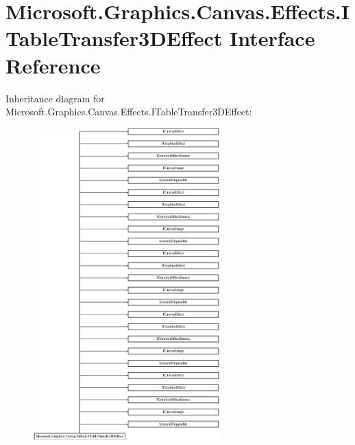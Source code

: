 \hypertarget{interface_microsoft_1_1_graphics_1_1_canvas_1_1_effects_1_1_i_table_transfer3_d_effect}{}\section{Microsoft.\+Graphics.\+Canvas.\+Effects.\+I\+Table\+Transfer3\+D\+Effect Interface Reference}
\label{interface_microsoft_1_1_graphics_1_1_canvas_1_1_effects_1_1_i_table_transfer3_d_effect}
Inheritance diagram for Microsoft.\+Graphics.\+Canvas.\+Effects.\+I\+Table\+Transfer3\+D\+Effect\+:\begin{figure}[H]
\begin{center}
\leavevmode
\includegraphics[height=12.000000cm]{interface_microsoft_1_1_graphics_1_1_canvas_1_1_effects_1_1_i_table_transfer3_d_effect}
\end{center}
\end{figure}
